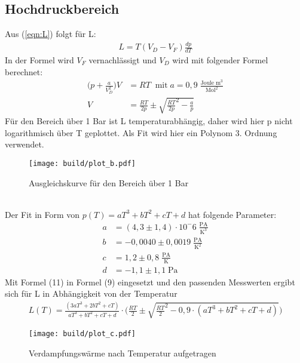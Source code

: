 \subsection{Hochdruckbereich}
Aus (\ref{eqn:L}) folgt für L:
\begin{align*}
    L = T(V_D - V_F) \frac{dp}{dT}
\end{align*}
In der Formel wird $V_F$ vernachlässigt und $V_D$ wird mit folgender Formel berechnet:
\begin{align*}
    \biggl( p+\frac{a}{V_D^2} \biggr) V &= RT\;\; \text{mit} \; a = 0,9 \; \frac{\text{Joule}\;{\text{m}}^3}{{\text{Mol}^2}}\\
    V &= \frac{RT}{2p} \pm \sqrt{{\frac{RT}{2p}}^2-\frac{a}{p}}
\end{align*}
Für den Bereich über 1 Bar ist L temperaturabhängig, daher wird hier p nicht logarithmisch über T geplottet.
Als Fit wird hier ein Polynom 3. Ordnung verwendet.
\begin{figure}
    \centering
    \texttt{[image: build/plot\_b.pdf]}
    \caption{Ausgleichskurve für den Bereich über 1 Bar}
    \label{fig:Hochdruck}
\end{figure}
\\Der Fit in Form von $p(T) = aT^3+bT^2+cT+d$ hat folgende Parameter:
\begin{align*}
    a &= (4,3\pm 1,4)\cdot 10^-6 \; \frac{\text{PA}}{\text{K}^3}\\
    b &= -0,0040\pm 0,0019 \; \frac{\text{PA}}{\text{K}^2}\\
    c &= 1,2\pm 0,8 \; \frac{\text{PA}}{\text{K}}\\
    d &= -1,1\pm 1,1  \; \text{Pa}
\end{align*}
Mit Formel (11) in Formel (9) eingesetzt und den passenden Messwerten ergibt sich für L in Abhängigkeit von der Temperatur
\begin{align*}
    L(T) = \frac{(3aT^3+2bT^2+cT)}{aT^3+bT^2+cT+d}\cdot \biggl( \frac{RT}{2} \pm \sqrt{\frac{RT}{2}^2 - 0,9 \cdot (aT^3+bT^2+cT+d)} \biggr)
\end{align*}
\begin{figure}
    \centering
    \texttt{[image: build/plot\_c.pdf]}
    \caption{Verdampfungswärme nach Temperatur aufgetragen}
    \label{fig:Hochdruck}
\end{figure}
